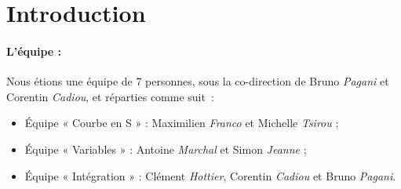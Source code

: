 \section*{Introduction}


\paragraph{L’équipe :}
Nous étions une équipe de 7 personnes, sous la co-direction de Bruno
\textit{Pagani} et Corentin \textit{Cadiou}, et réparties comme suit :
\begin{itemize}
    \item Équipe « Courbe en S » : Maximilien \textit{Franco} et Michelle \textit{Tsirou} ;
    \item Équipe « Variables » : Antoine \textit{Marchal} et Simon \textit{Jeanne} ;
    \item Équipe « Intégration » : Clément \textit{Hottier}, Corentin \textit{Cadiou} et Bruno \textit{Pagani}.
\end{itemize}
